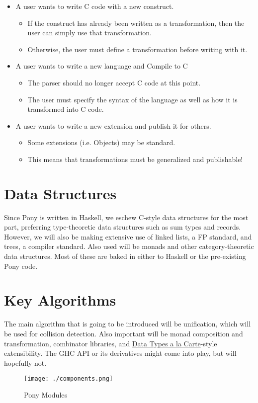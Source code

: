 \documentclass[11pt]{article}
\begin{document}
\begin{itemize}
\item A user wants to write C code with a new construct.
\begin{itemize}
\item If the construct has already been written as a transformation, then the user can simply use that transformation.
\item Otherwise, the user must define a transformation before writing with it.
\end{itemize}
\item A user wants to write a new language and Compile to C
\begin{itemize}
\item The parser should no longer accept C code at this point.
\item The user must specify the syntax of the language as well as how it is transformed into C code.
\end{itemize}
\item A user wants to write a new extension and publish it for others.
\begin{itemize}
\item Some extensions (i.e. Objects) may be standard.
\item This means that transformations must be generalized and publishable!
\end{itemize}
\end{itemize}
\section{Data Structures}
\label{sec-5}


Since Pony is written in Haskell, we eschew C-style data structures for the most part, preferring type-theoretic data structures such as sum types and records. However, we will also be making extensive use of linked lists, a FP standard, and trees, a compiler standard. Also used will be monads and other category-theoretic data structures. Most of these are baked in either to Haskell or the pre-existing Pony code.
\section{Key Algorithms}
\label{sec-6}


The main algorithm that is going to be introduced will be unification, which will be used for collision detection. Also important will be monad composition and transformation, combinator libraries, and \underline{Data Types a la Carte}-style extensibility. The GHC API or its derivatives might come into play, but will hopefully not.

\begin{figure}[htb]
\centering
\texttt{[image: ./components.png]}
\caption{\label{fig:modules}Pony Modules}
\end{figure}
\end{document}
